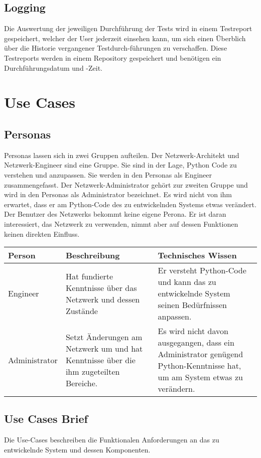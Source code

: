 \documentclass[
	ngerman,
	toc=listof, %
	toc=bibliography, %
	footnotes=multiple, %
	parskip=half, %
	numbers=noendperiod %
]{scrartcl}
\begin{document}
	\subsection{Logging}
		Die Auswertung der jeweiligen Durchführung der Tests wird in einem Testreport gespeichert, welcher der User jederzeit einsehen kann, 
		um sich einen Überblich über die Historie vergangener Testdurch-führungen zu verschaffen. 
		Diese Testreports werden in einem Repository gespeichert und benötigen ein Durchführungsdatum und -Zeit.

\section{Use Cases}
	\subsection{Personas}
	Personas lassen sich in zwei Gruppen aufteilen. Der Netzwerk-Architekt und Netzwerk-Engineer sind eine Gruppe. 
	Sie sind in der Lage, Python Code zu verstehen und anzupassen. Sie werden in den Personas als Engineer zusammengefasst.
	Der Netzwerk-Administrator gehört zur zweiten Gruppe und wird in den Personas als Administrator bezeichnet.
	Es wird nicht von ihm erwartet, dass er am Python-Code des zu entwickelnden Systems etwas verändert.
	Der Benutzer des Netzwerks bekommt keine eigene Perona. 
	Er ist daran interessiert, das Netzwerk zu verwenden, nimmt aber auf dessen Funktionen keinen direkten Einfluss.

		\begin{tabularx}{\textwidth}{lXX}
			\toprule
			Person & Beschreibung & Technisches Wissen \\
			\midrule
			Engineer & Hat fundierte Kenntnisse über das Netzwerk und dessen Zustände & Er versteht Python-Code und kann das zu entwickelnde System seinen Bedürfnissen anpassen.\\
			\midrule
			Administrator & Setzt Änderungen am Netzwerk um und hat Kenntnisse über die ihm zugeteilten Bereiche. & Es wird nicht davon ausgegangen, dass ein Administrator genügend Python-Kenntnisse hat, um am System etwas zu verändern.\\
			\bottomrule
		\end{tabularx}
		\newpage

	\subsection{Use Cases Brief}
	Die Use-Cases beschreiben die Funktionalen Anforderungen an das zu entwickelnde System und dessen Komponenten.
\end{document}
